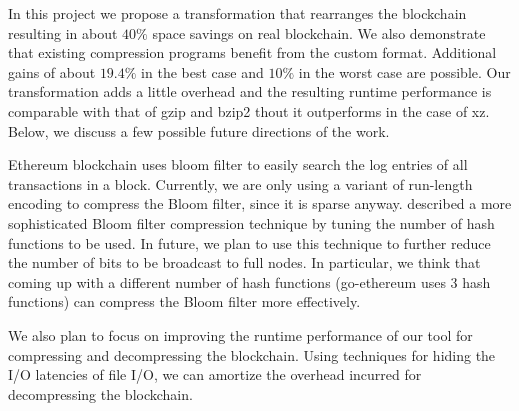 In this project we propose a transformation that rearranges the \eth{} blockchain resulting in about $40\%$ space savings on real blockchain.
We also demonstrate that existing compression programs benefit from the custom format. Additional gains of about $19.4\%$ in the best case and $10\%$ in the worst case are possible.
Our transformation adds a little overhead and 
the resulting runtime performance is comparable with that of gzip and bzip2 thout it outperforms in the case of xz. 
Below, we discuss a few possible future directions of the work.

Ethereum blockchain uses bloom filter to easily search the log entries of all transactions in a block.
Currently, we are only using a variant of run-length encoding to compress the Bloom filter, since it is sparse anyway. 
\citet{mitzenmacher:2001} described a more sophisticated Bloom filter compression technique by tuning the number of hash functions to be used. 
In future, we plan to use this technique to further reduce the number of bits to be broadcast to full nodes.
In particular, we think that coming up with a different number of hash functions (go-ethereum uses 3 hash functions) can compress the Bloom filter more effectively.

We also plan to focus on improving the runtime performance of our tool for compressing and decompressing the blockchain.
Using techniques for hiding the I/O latencies of file I/O, we can amortize 
the overhead incurred for decompressing the blockchain.


